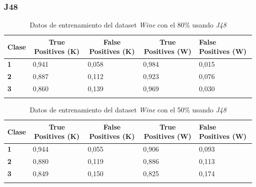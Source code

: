 \documentclass[10pt,a4paper]{article}
\begin{document}
\subsubsection{J48}
\begin{table}[h!]
	\begin{tabular}{lllll}
		\hline
		\multicolumn{1}{|c|}{\textbf{Clase}} & \multicolumn{1}{c|}{\textbf{True Positives (K)}} & \multicolumn{1}{c|}{\textbf{False Positives (K)}} & \multicolumn{1}{c|}{\textbf{True Positives (W)}} & \multicolumn{1}{l|}{\textbf{False Positives (W)}} \\ \hline
		\multicolumn{1}{|l|}{\textbf{1}} & \multicolumn{1}{l|}{0,941}          & \multicolumn{1}{l|}{0,058}          & \multicolumn{1}{l|}{0,984}          & \multicolumn{1}{l|}{0,015} \\ \hline
		\multicolumn{1}{|l|}{\textbf{2}} & \multicolumn{1}{l|}{0,887}          & \multicolumn{1}{l|}{0,112}          & \multicolumn{1}{l|}{0,923}          & \multicolumn{1}{l|}{0,076} \\ \hline
		\multicolumn{1}{|l|}{\textbf{3}} & \multicolumn{1}{l|}{0,860}          & \multicolumn{1}{l|}{0,139}          & \multicolumn{1}{l|}{0,969}          & \multicolumn{1}{l|}{0,030}\\ \hline
		\textbf{}                       &                                &                                &                                &                      
		
	\end{tabular}
	\caption{Datos de entrenamiento del dataset \emph{Wine} con el 80\% usando \emph{J48}}
	\label{tab:wine_j48_80}
\end{table}

\begin{table}[h!]
	\begin{tabular}{lllll}
		\hline
		\multicolumn{1}{|c|}{\textbf{Clase}} & \multicolumn{1}{c|}{\textbf{True Positives (K)}} & \multicolumn{1}{c|}{\textbf{False Positives (K)}} & \multicolumn{1}{c|}{\textbf{True Positives (W)}} & \multicolumn{1}{l|}{\textbf{False Positives (W)}} \\ \hline
		\multicolumn{1}{|l|}{\textbf{1}} & \multicolumn{1}{l|}{0,944}          & \multicolumn{1}{l|}{0,055}          & \multicolumn{1}{l|}{0,906}          & \multicolumn{1}{l|}{0,093} \\ \hline
		\multicolumn{1}{|l|}{\textbf{2}} & \multicolumn{1}{l|}{0,880}          & \multicolumn{1}{l|}{0,119}          & \multicolumn{1}{l|}{0,886}          & \multicolumn{1}{l|}{0,113} \\ \hline
		\multicolumn{1}{|l|}{\textbf{3}} & \multicolumn{1}{l|}{0,849}          & \multicolumn{1}{l|}{0,150}          & \multicolumn{1}{l|}{0,825}          & \multicolumn{1}{l|}{0,174}\\ \hline
		\textbf{}                       &                                &                                &                                &                      
		
	\end{tabular}
	\caption{Datos de entrenamiento del dataset \emph{Wine} con el 50\% usando \emph{J48}}
	\label{tab:wine_j48_50}
\end{table}
\end{document}
